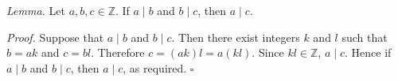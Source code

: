 \textit{Lemma.} Let $a, b, c \in \mathbb{Z}$.
If $a \mid b$ and $b \mid c$, then $a \mid c$.

\textit{Proof.} Suppose that $a \mid b$ and $b \mid c$.
Then there exist integers $k$ and $l$ such that $b = ak$ and $c = bl$.
Therefore $c = (ak)l = a(kl)$.
Since $kl \in \mathbb{Z}$, $a \mid c$.
Hence if $a \mid b$ and $b \mid c$, then $a \mid c$, as required. \hfill$\square$